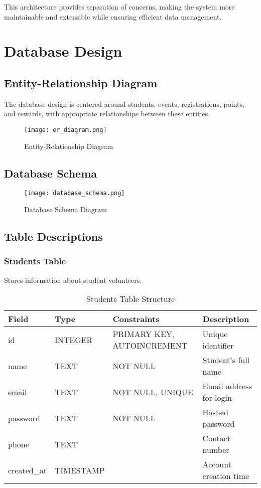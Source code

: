 \documentclass[12pt,a4paper]{report}
\begin{document}
This architecture provides separation of concerns, making the system more maintainable and extensible while ensuring efficient data management.

\section{Database Design}

\subsection{Entity-Relationship Diagram}
The database design is centered around students, events, registrations, points, and rewards, with appropriate relationships between these entities.

\begin{figure}[H]
    \centering
    \texttt{[image: er\_diagram.png]}
    \caption{Entity-Relationship Diagram}
    \label{fig:er-diagram}
\end{figure}

\subsection{Database Schema}

\begin{figure}[H]
    \centering
    \texttt{[image: database\_schema.png]}
    \caption{Database Schema Diagram}
    \label{fig:schema}
\end{figure}

\subsection{Table Descriptions}

\subsubsection{Students Table}
Stores information about student volunteers.

\begin{table}[H]
    \centering
    \begin{tabular}{|l|l|l|p{4cm}|}
        \hline
        \textbf{Field} & \textbf{Type} & \textbf{Constraints} & \textbf{Description} \\
        \hline
        id & INTEGER & PRIMARY KEY, AUTOINCREMENT & Unique identifier \\
        \hline
        name & TEXT & NOT NULL & Student's full name \\
        \hline
        email & TEXT & NOT NULL, UNIQUE & Email address for login \\
        \hline
        password & TEXT & NOT NULL & Hashed password \\
        \hline
        phone & TEXT & & Contact number \\
        \hline
        created\_at & TIMESTAMP & & Account creation time \\
        \hline
    \end{tabular}
    \caption{Students Table Structure}
    \label{tab:students}
\end{table}
\end{document}

